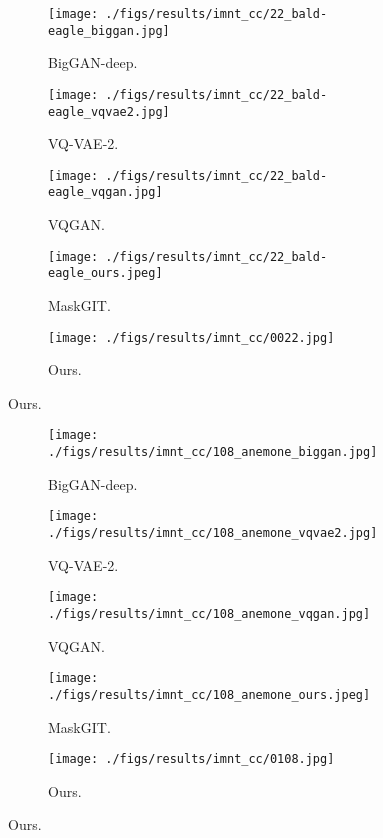 \documentclass[10pt,twocolumn,letterpaper]{article}
\begin{document}
\clearpage
\begin{figure}[t]
    \centering
	\begin{subfigure}[b]{0.19\textwidth}
         \centering
         \texttt{[image: ./figs/results/imnt\_cc/22\_bald-eagle\_biggan.jpg]}
         \caption{BigGAN-deep.}
     \end{subfigure}
     \begin{subfigure}[b]{0.19\textwidth}
         \centering
         \texttt{[image: ./figs/results/imnt\_cc/22\_bald-eagle\_vqvae2.jpg]}
         \caption{VQ-VAE-2.}
     \end{subfigure}
     \begin{subfigure}[b]{0.19\textwidth}
         \centering
         \texttt{[image: ./figs/results/imnt\_cc/22\_bald-eagle\_vqgan.jpg]}
         \caption{VQGAN.}
     \end{subfigure}
     \begin{subfigure}[b]{0.19\textwidth}
         \centering
         \texttt{[image: ./figs/results/imnt\_cc/22\_bald-eagle\_ours.jpeg]}
         \caption{MaskGIT.}
     \end{subfigure}
     \begin{subfigure}[b]{0.19\textwidth}
         \centering
         \texttt{[image: ./figs/results/imnt\_cc/0022.jpg]}
         \caption{Ours.}
     \end{subfigure}
\end{figure}

\begin{figure}[t]
    \centering
     \begin{subfigure}[b]{0.19\textwidth}
         \centering
         \texttt{[image: ./figs/results/imnt\_cc/108\_anemone\_biggan.jpg]}
         \caption{BigGAN-deep.}
     \end{subfigure}
     \begin{subfigure}[b]{0.19\textwidth}
         \centering
         \texttt{[image: ./figs/results/imnt\_cc/108\_anemone\_vqvae2.jpg]}
         \caption{VQ-VAE-2.}
     \end{subfigure}
     \begin{subfigure}[b]{0.19\textwidth}
         \centering
         \texttt{[image: ./figs/results/imnt\_cc/108\_anemone\_vqgan.jpg]}
         \caption{VQGAN.}
     \end{subfigure}
     \begin{subfigure}[b]{0.19\textwidth}
         \centering
         \texttt{[image: ./figs/results/imnt\_cc/108\_anemone\_ours.jpeg]}
         \caption{MaskGIT.}
     \end{subfigure}
     \begin{subfigure}[b]{0.19\textwidth}
         \centering
         \texttt{[image: ./figs/results/imnt\_cc/0108.jpg]}
         \caption{Ours.}
     \end{subfigure}
\end{figure}
\end{document}
